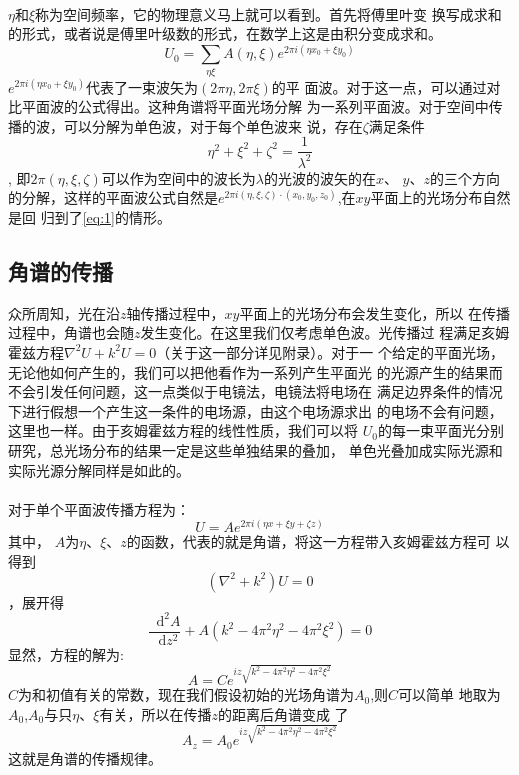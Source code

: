 \documentclass{article}
\newcommand*{\dif}{\mathop{}\!\mathrm{d}}
\begin{document}
\paragraph{}
$\eta$和$\xi$称为空间频率，它的物理意义马上就可以看到。首先将傅里叶变
换写成求和的形式，或者说是傅里叶级数的形式，在数学上这是由积分变成求和。
\begin{equation}
  \label{eq:1}
  U_0=\sum_{\eta \xi}A(\eta,\xi)e^{2\pi i(\eta x_0+\xi y_0)}
\end{equation}
$e^{2\pi i(\eta x_0+\xi y_0)}$代表了一束波矢为$(2\pi\eta,2\pi\xi)$的平
面波。对于这一点，可以通过对比平面波的公式得出。这种角谱将平面光场分解
为一系列平面波。对于空间中传播的波，可以分解为单色波，对于每个单色波来
说，存在$\zeta$满足条件\[\eta^2+\xi^2+\zeta^{2}=\frac{1}{\lambda^2}\],
即$2\pi(\eta,\xi,\zeta)$可以作为空间中的波长为$\lambda$的光波的波矢的在$x$、
$y$、$z$的三个方向的分解，这样的平面波公式自然是$e^{2\pi
  i(\eta,\xi,\zeta)\cdot(x_0,y_0,z_0)}$,在$xy$平面上的光场分布自然是回
归到了\ref{eq:1}的情形。
\subsection{角谱的传播}
众所周知，光在沿$z$轴传播过程中，$xy$平面上的光场分布会发生变化，所以
在传播过程中，角谱也会随$z$发生变化。在这里我们仅考虑单色波。光传播过
程满足亥姆霍兹方程$\nabla^2U+k^2U=0$（关于这一部分详见附录）。对于一
个给定的平面光场，无论他如何产生的，我们可以把他看作为一系列产生平面光
的光源产生的结果而不会引发任何问题，这一点类似于电镜法，电镜法将电场在
满足边界条件的情况下进行假想一个产生这一条件的电场源，由这个电场源求出
的电场不会有问题，这里也一样。由于亥姆霍兹方程的线性性质，我们可以将
$U_0$的每一束平面光分别研究，总光场分布的结果一定是这些单独结果的叠加，
单色光叠加成实际光源和实际光源分解同样是如此的。
\paragraph{}
对于单个平面波传播方程为：\[U=Ae^{2\pi i(\eta x+\xi y+\zeta z)}\]其中，
$A$为$\eta$、$\xi$、$z$的函数，代表的就是角谱，将这一方程带入亥姆霍兹方程可
以得到\[(\nabla^2+k^2)U=0\]，展开得\[\frac{\dif^2A}{\dif
    z^2}+A(k^2-4\pi^{2}\eta^2-4\pi^2\xi^2)=0\]显然，方程的解为:
\begin{equation}
  \label{eq:2}
  A=Ce^{iz \sqrt{k^2-4\pi^2\eta^2-4\pi^2\xi^2}}
\end{equation}
$C$为和初值有关的常数，现在我们假设初始的光场角谱为$A_0$,则$C$可以简单
地取为$A_0$,$A_0$与只$\eta$、$\xi$有关，所以在传播$z$的距离后角谱变成
了
\begin{equation}
  \label{eq:3}
  A_z=A_0e^{iz \sqrt{k^2-4\pi^2\eta^2-4\pi^2\xi^2}}
\end{equation}
这就是角谱的传播规律。
\end{document}
